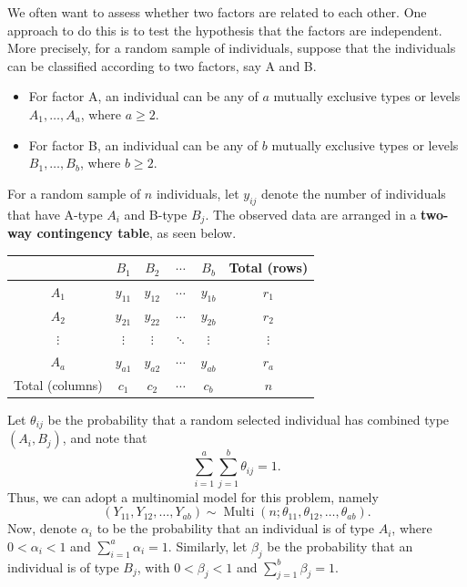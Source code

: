 \documentclass[10pt]{article}
\DeclareMathOperator{\Multi}{Multi}
\theoremstyle{newstyle}
\begin{document}
We often want to assess whether two factors are related to each other. One approach to do this 
is to test the hypothesis that the factors are independent. More precisely, for 
a random sample of individuals, suppose that the individuals can be classified according to 
two factors, say A and B. 
\begin{itemize}
    \item For factor A, an individual can be any of $a$ mutually exclusive types or levels 
    $A_1, \dots, A_a$, where $a \geq 2$. 
    \item For factor B, an individual can be any of $b$ mutually exclusive types or levels 
    $B_1, \dots, B_b$, where $b \geq 2$. 
\end{itemize}
For a random sample of $n$ individuals, let $y_{ij}$ denote the number of individuals that have 
A-type $A_i$ and B-type $B_j$. The observed data are arranged in a {\bf two-way contingency table}, 
as seen below. 
\begin{table}[H]
\centering
\begin{tabular}{|c|c|c|c|c|c|}
\hline
                & $B_1$    & $B_2$    & $\cdots$ & $B_b$    & Total (rows) \\ \hline
$A_1$           & $y_{11}$ & $y_{12}$ & $\cdots$ & $y_{1b}$ & $r_1$        \\ \hline
$A_2$           & $y_{21}$ & $y_{22}$ & $\cdots$ & $y_{2b}$ & $r_2$        \\ \hline
$\vdots$        & $\vdots$ & $\vdots$ & $\ddots$ & $\vdots$ & $\vdots$     \\ \hline
$A_a$           & $y_{a1}$ & $y_{a2}$ & $\cdots$ & $y_{ab}$ & $r_a$        \\ \hline
Total (columns) & $c_1$    & $c_2$    & $\cdots$ & $c_b$    & $n$          \\ \hline
\end{tabular}
\end{table}

Let $\theta_{ij}$ be the probability that a random selected individual has combined type 
$(A_i, B_j)$, and note that 
\[ \sum_{i=1}^a \sum_{j=1}^b \theta_{ij} = 1. \]
Thus, we can adopt a multinomial model for this problem, namely 
\[ (Y_{11}, Y_{12}, \dots, Y_{ab}) \sim \Multi(n; \theta_{11}, \theta_{12}, \dots, \theta_{ab}). \]
Now, denote $\alpha_i$ to be the probability that an individual is of type $A_i$, where 
$0 < \alpha_i < 1$ and $\sum_{i=1}^a \alpha_i = 1$. Similarly, let $\beta_j$ be the probability 
that an individual is of type $B_j$, with $0 < \beta_j < 1$ and $\sum_{j=1}^b \beta_j = 1$. 
\end{document}
